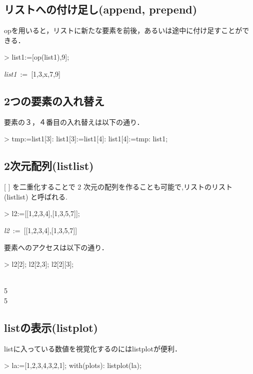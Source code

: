 \subsection{リストへの付け足し(append, prepend)}
opを用いると，リストに新たな要素を前後，あるいは途中に付け足すことができる．
\begin{MapleInput}
> list1:=[op(list1),9];
\end{MapleInput}
\begin{MapleOutput}
{\it list1}\, := \,[1,3,x,7,9]
\end{MapleOutput}

\subsection{2つの要素の入れ替え}
要素の３，４番目の入れ替えは以下の通り．
\begin{MapleInput}
> tmp:=list1[3]: 
  list1[3]:=list1[4]: 
  list1[4]:=tmp: 
  list1;
\end{MapleInput}
\begin{MapleOutput}
[1, 3, 7, x, 9]
\end{MapleOutput}

\subsection{2次元配列(listlist)}
[ ] を二重化することで 2 次元の配列を作ることも可能で,リストのリスト (listlist) と呼ばれる.
\begin{MapleInput}
> l2:=[[1,2,3,4],[1,3,5,7]];
\end{MapleInput}
\begin{MapleOutput}
{\it l2}\, := \,[[1,2,3,4],[1,3,5,7]]
\end{MapleOutput}

                         
要素へのアクセスは以下の通り．
\begin{MapleInput}
> l2[2]; l2[2,3]; l2[2][3];
\end{MapleInput}
\begin{MapleOutputGather}
[1, 3, 5, 7] \notag \\
5 \notag \\
5 \notag
\end{MapleOutputGather}

\subsection{listの表示(listplot)}
listに入っている数値を視覚化するのにはlistplotが便利．
\begin{MapleInput}
> la:=[1,2,3,4,3,2,1]; 
  with(plots): 
  listplot(la);
\end{MapleInput}
\begin{MapleOutput}
[1, 2, 3, 4, 3, 2, 1]
\end{MapleOutput}


